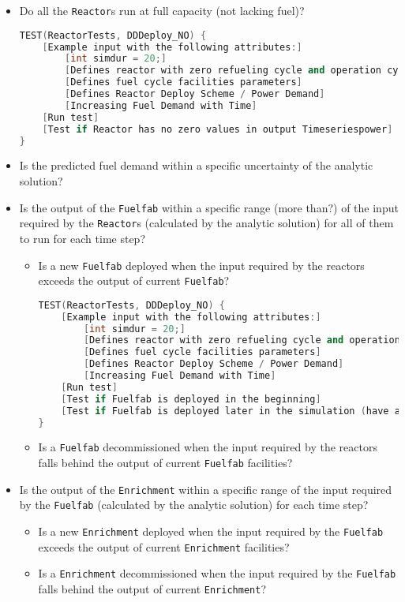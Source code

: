 \documentclass[12pt,letterpaper]{article}
\begin{document}
\begin{itemize}
\item  Do all the \texttt{Reactor}s run at full capacity (not lacking fuel)? 
\begin{lstlisting}[language=C++]
TEST(ReactorTests, DDDeploy_NO) {
    [Example input with the following attributes:]
        [int simdur = 20;]
        [Defines reactor with zero refueling cycle and operation cycle of 1 month]
        [Defines fuel cycle facilities parameters]
        [Defines Reactor Deploy Scheme / Power Demand]
        [Increasing Fuel Demand with Time]
    [Run test]
    [Test if Reactor has no zero values in output Timeseriespower]
}
\end{lstlisting}

\item Is the predicted fuel demand within a specific uncertainty of the analytic solution? 

\item  Is the output of the \texttt{Fuelfab} within a specific range (more than?) of the input required by the \texttt{Reactor}s (calculated by the analytic solution) for all of them to run for each time step? 
\begin{itemize}
\item Is a new \texttt{Fuelfab} deployed when the input required by the reactors exceeds the output of current \texttt{Fuelfab}?
\begin{lstlisting}[language=C++]
TEST(ReactorTests, DDDeploy_NO) {
    [Example input with the following attributes:]
        [int simdur = 20;]
        [Defines reactor with zero refueling cycle and operation cycle of 1 month]
        [Defines fuel cycle facilities parameters]
        [Defines Reactor Deploy Scheme / Power Demand]
        [Increasing Fuel Demand with Time]
    [Run test]
    [Test if Fuelfab is deployed in the beginning]
    [Test if Fuelfab is deployed later in the simulation (have analytic solution)]
}
\end{lstlisting}
\item Is a \texttt{Fuelfab} decommissioned when the input required by the reactors falls behind the output of current \texttt{Fuelfab} facilities?
\end{itemize}

\item  Is the output of the \texttt{Enrichment} within a specific range of the input required by the \texttt{Fuelfab} (calculated by the analytic solution) for each time step? 
\begin{itemize}
\item Is a new \texttt{Enrichment} deployed when the input required by the \texttt{Fuelfab} exceeds the output of current \texttt{Enrichment} facilities?
\item Is a \texttt{Enrichment} decommissioned when the input required by the \texttt{Fuelfab} falls behind the output of current \texttt{Enrichment}?
\end{itemize}


\end{itemize}
\end{document}
